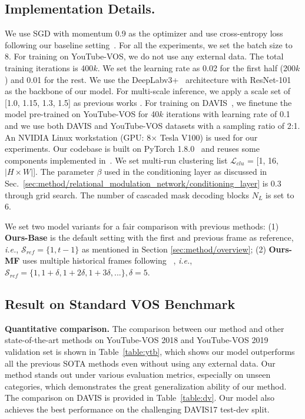 \documentclass[sigconf]{acmart}
\begin{document}
\subsection{Implementation Details.}
We use SGD \cite{bottou2010large} with momentum 0.9 as the optimizer and use cross-entropy loss following our baseline setting~\cite{yang2020collaborative}.
For all the experiments, we set the batch size to 8.
For training on YouTube-VOS, we do not use any external data.
The total training iterations is 400$k$. We set
the learning rate as 0.02 for the first half (200$k$) and 0.01 for the rest.
We use the DeepLabv3+~\cite{chen2018encoder} architecture with ResNet-101~\cite{he2016deep} as the backbone of our model. For multi-scale inference, 
we apply a scale set of [1.0, 1.15, 1.3, 1.5] as previous works \cite{yang2021collaborative,yang2020collaborative}.
For training on DAVIS~\cite{perazzi2016benchmark}, 
    we finetune the model pre-trained on YouTube-VOS for 40$k$ iterations with learning rate of 0.1 and we use both DAVIS and YouTube-VOS datasets with a sampling ratio of 2:1. An NVIDIA Linux workstation (GPU: 8$\times$ Tesla V100) is used for our experiments. Our codebase is built on PyTorch 1.8.0~\cite{paszke2019pytorch} and 
    reuses some components implemented in~\cite{yang2020collaborative}. 
We set multi-run clustering list $\mathcal{L}_{clu}$ = [1, 16, $|H\times W|$]. The parameter $\beta$ used in the conditioning layer as discussed in 
    Sec.~\ref{sec:method/relational_modulation_network/conditioning_layer} is $0.3$ through grid search. The number of cascaded mask decoding blocks ${N_L}$ is set to 6. 

 We set two model variants for a fair comparison with previous methods: (1) \textbf{Ours-Base} is the default setting with the first and previous frame as reference, \textit{i.e.}, $\mathcal{S}_{ref}=\{1,t-1\}$ as mentioned in Section \ref{sec:method/overview}; (2) \textbf{Ours-MF} uses multiple historical frames following ~\cite{oh2019video,yang2021associating}, \textit{i.e.}, $\mathcal{S}_{ref}=\{1, 1+\delta, 1+2\delta, 1+3\delta, ...\}, \delta=5$.

\subsection{Result on Standard VOS Benchmark}
\textbf{Quantitative comparison.}
The comparison between our method and other state-of-the-art methods
    on YouTube-VOS 2018 and YouTube-VOS 2019 validation set
        is shown in Table~\ref{table:ytb}, which shows
    our model outperforms all the previous SOTA methods even without using any external data.
Our method stands out under various evaluation metrics, especially on unseen categories, 
    which demonstrates the great generalization ability of our method. The comparison on DAVIS is provided in Table~\ref{table:dv}. Our model also achieves the best performance on the challenging DAVIS17 test-dev split.
    
\end{document}
